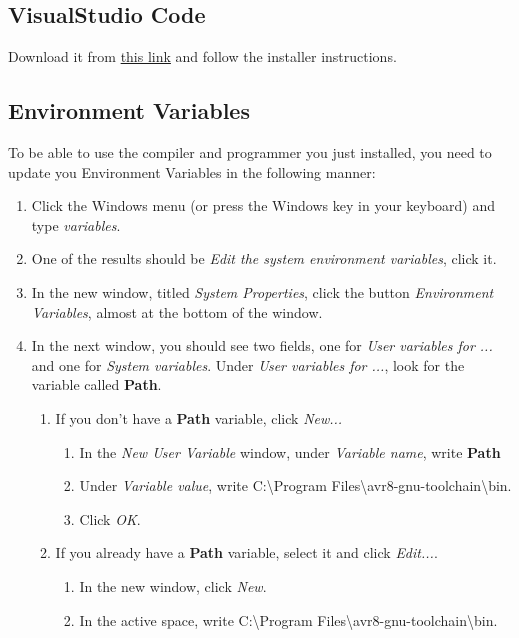 \documentclass[10pt,letterpaper]{article}
\begin{document}
\subsection{VisualStudio Code}
Download it from \href{https://code.visualstudio.com/Download}{this link} and follow the installer instructions.

\subsection{Environment Variables}
To be able to use the compiler and programmer you just installed, you need to update you Environment Variables in the following manner:
\begin{enumerate}
    \item Click the Windows menu (or press the Windows key in your keyboard) and type \textit{variables}.
    \item One of the results should be \textit{Edit the system environment variables}, click it.
    \item In the new window, titled \textit{System Properties}, click the button \textit{Environment Variables}, almost at the bottom of the window.
    \item In the next window, you should see two fields, one for \textit{User variables for ...} and one for \textit{System variables}. Under \textit{User variables for ...}, look for the variable called \textbf{Path}.
    \begin{enumerate}
        \item If you don't have a \textbf{Path} variable, click \textit{New...} 
        \begin{enumerate}
            \item In the \textit{New User Variable} window, under \textit{Variable name}, write \textbf{Path}
            \item Under \textit{Variable value}, write {\color{ForestGreen}C:\textbackslash Program Files\textbackslash avr8-gnu-toolchain\textbackslash bin}.
            \item Click \textit{OK}.
        \end{enumerate}
        \item If you already have a \textbf{Path} variable, select it and click \textit{Edit...}. 
        \begin{enumerate}
            \item In the new window, click \textit{New}.
            \item In the active space, write {\color{ForestGreen}C:\textbackslash Program Files\textbackslash avr8-gnu-toolchain\textbackslash bin}.

\end{enumerate}
\end{enumerate}
\end{enumerate}
\end{document}
